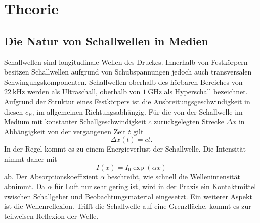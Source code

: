
\section{Theorie}
\label{sec:Theorie}
\subsection{Die Natur von Schallwellen in Medien}
Schallwellen sind longitudinale Wellen des Druckes.
 Innerhalb von Festkörpern besitzen Schallwellen
aufgrund von Schubspannungen jedoch auch transversalen Schwingungskomponenten.
Schallwellen oberhalb des hörbaren Bereiches von $\SI{22}{\kilo\hertz}$ werden als
Ultraschall, oberhalb von $\SI{1}{\giga\hertz}$ als Hyperschall bezeichnet.
Aufgrund der Struktur eines Festkörpers ist die Ausbreitungsgeschwindigkeit in  diesen $c_\text{Fe}$ im allgemeinen Richtungsabhängig.
Für die von der Schallwelle im Medium mit konstanter Schallgeschwindigkeit $c$ zurückgelegten Strecke $\Delta x$ in Abhängigkeit von der vergangenen Zeit $t$ gilt
\begin{equation}
	\Delta x (t)= c t \label{eq:MIST}\text{.}
\end{equation}
In der Regel kommt es zu einem Energieverlust der Schallwelle. Die Intensität nimmt daher mit
\begin{equation}
  I\left(x\right) = I_0 \exp\left(\alpha x\right)\label{I}
\end{equation}
ab. Der Absorptionskoeffizient $\alpha$ beschreibt, wie schnell die Wellenintensität
abnimmt. Da $\alpha$ für Luft nur sehr gering ist, wird in der Praxis ein Kontaktmittel
zwischen Schallgeber und Beobachtungsmaterial eingesetzt. Ein weiterer Aspekt ist die Wellenreflexion.
Trifft die Schallwelle auf eine Grenzfläche, kommt es zur teilweisen Reflexion der Welle.

